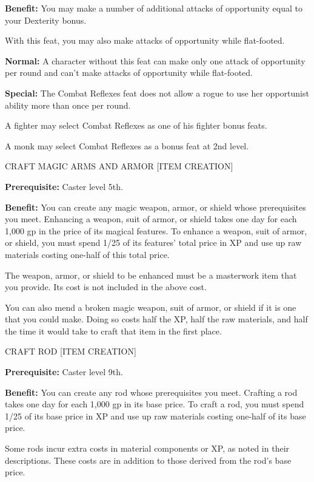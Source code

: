 \documentclass{article}
\begin{document}
\textbf{Benefit:} You may make a number of additional attacks of opportunity equal 
to your Dexterity bonus.

With this feat, you may also make attacks of opportunity while flat-footed.

\textbf{Normal:} A character without this feat can make only one attack of opportunity 
per round and can't make attacks of opportunity while flat-footed.

\textbf{Special:} The Combat Reflexes feat does not allow a rogue to use her opportunist 
ability more than once per round.

A fighter may select Combat Reflexes as one of his fighter bonus feats.

A monk may select Combat Reflexes as a bonus feat at 2nd level.

\vspace{12pt}
CRAFT MAGIC ARMS AND ARMOR [ITEM CREATION]

\textbf{Prerequisite:} Caster level 5th.

\textbf{Benefit:} You can create any magic weapon, armor, or shield whose prerequisites 
you meet. Enhancing a weapon, suit of armor, or shield takes one day for each 1,000 
gp in the price of its magical features. To enhance a weapon, suit of armor, or 
shield, you must spend 1/25 of its features' total price in XP and use up raw materials 
costing one-half of this total price.

The weapon, armor, or shield to be enhanced must be a masterwork item that you 
provide. Its cost is not included in the above cost.

You can also mend a broken magic weapon, suit of armor, or shield if it is one 
that you could make. Doing so costs half the XP, half the raw materials, and half 
the time it would take to craft that item in the first place.

\vspace{12pt}
CRAFT ROD [ITEM CREATION]

\textbf{Prerequisite:} Caster level 9th.

\textbf{Benefit:} You can create any rod whose prerequisites you meet. Crafting 
a rod takes one day for each 1,000 gp in its base price. To craft a rod, you must 
spend 1/25 of its base price in XP and use up raw materials costing one-half of 
its base price.

Some rods incur extra costs in material components or XP, as noted in their descriptions. 
These costs are in addition to those derived from the rod's base price.
\end{document}
